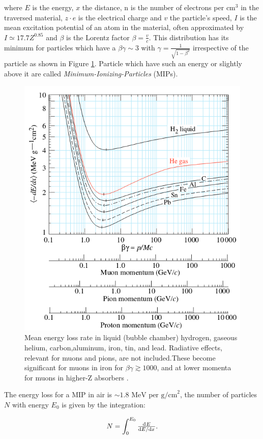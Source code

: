 where $E$ is the energy, $x$ the distance, n is the number of electrons per $\text{cm}^3$ in the traversed material, $z \cdot e$ is the electrical charge and $v$ the particle's speed, $I$ is the mean excitation potential of an atom in the material, often approximated by $I\simeq 17.7 Z^{0.85}$ and $\beta$ is the Lorentz factor $\beta = \frac{v}{c}$. This distribution has its minimum for particles which have a $\beta\gamma \sim 3$ with $\gamma=\frac{1}{\sqrt{1-\beta^2}}$ irrespective of the particle as shown in Figure \ref{fig:BB}. Particle which have such an energy or slightly above it are called \textit{Minimum-Ionizing-Particles} (MIPs).

\begin{figure}[htbp]
\centering
\includegraphics[width=0.7\linewidth]{./fig/BB.png}
\caption{Mean energy loss rate in liquid (bubble chamber) hydrogen, gaseous helium, carbon,aluminum, iron, tin, and lead. Radiative effects, relevant for muons and pions, are not included.These become significant for muons in iron for $\beta\gamma \gtrsim 1000$, and at lower momenta for muons in higher-Z absorbers \cite{Tanabashi:2018oca}.}
\label{fig:BB}
\end{figure}


The energy loss for a MIP in air is $\sim 1.8 \text{ MeV per g/cm}^2$, the number of particles $N$ with energy $E_0$ is given by the integration:

\begin{equation}
N=\int_0^{E_0}\od{E}{E/\text{d}x}.
\end{equation}


